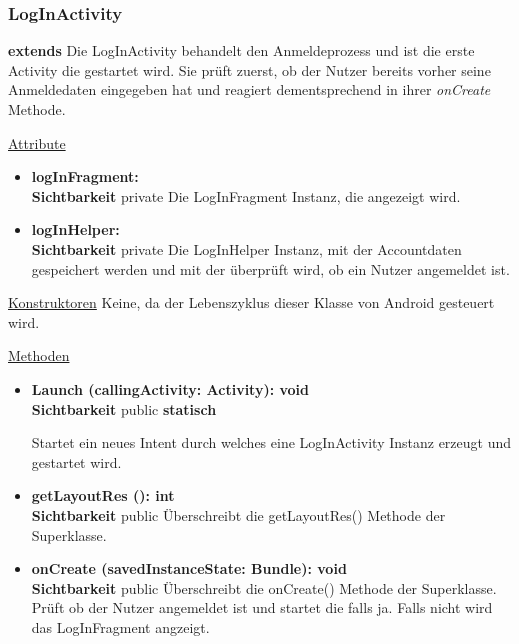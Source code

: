 \subsubsection{LogInActivity} \label{app:klasse:LogInActivity}
\textbf{extends} \newline
Die LogInActivity behandelt den Anmeldeprozess und ist die erste Activity die gestartet wird. Sie prüft zuerst, ob der Nutzer bereits vorher seine Anmeldedaten eingegeben hat und reagiert dementsprechend in ihrer \textit{onCreate} Methode.
\newline

\underline{Attribute}
\begin{itemize}
\itemsep0pt
\item \textbf{logInFragment: } \hfill\\ 
\textbf{Sichtbarkeit} private\newline
Die LogInFragment Instanz, die angezeigt wird.

\item \textbf{logInHelper: } \hfill\\ 
\textbf{Sichtbarkeit} private\newline
Die LogInHelper Instanz, mit der Accountdaten gespeichert werden und mit der überprüft wird, ob ein Nutzer angemeldet ist.

\end{itemize}

\underline{Konstruktoren}\newline
\indent Keine, da der Lebenszyklus dieser Klasse von Android gesteuert wird.\newline

\underline{Methoden}
\begin{itemize}
\itemsep0pt

\item \textbf{Launch (callingActivity: Activity): void}\hfill\\
\textbf{Sichtbarkeit} public \newline
\textbf{statisch} 

Startet ein neues Intent durch welches eine LogInActivity Instanz erzeugt und gestartet wird.

\item \textbf{getLayoutRes (): int}\hfill\\
\textbf{Sichtbarkeit} public\newline
Überschreibt die getLayoutRes() Methode der Superklasse.

\item \textbf{onCreate (savedInstanceState: Bundle): void}\hfill\\
\textbf{Sichtbarkeit} public\newline
Überschreibt die onCreate() Methode der Superklasse. Prüft ob der Nutzer angemeldet ist und startet die  falls ja. Falls nicht wird das LogInFragment angzeigt.

\end{itemize}